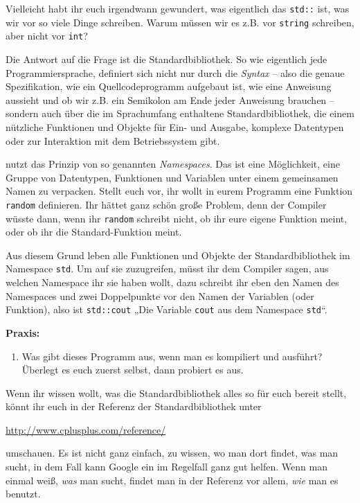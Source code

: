 
Vielleicht habt ihr euch irgendwann gewundert, was eigentlich das
\texttt{std::} ist, was wir vor so viele Dinge schreiben. Warum müssen wir es
z.B. vor \texttt{string} schreiben, aber nicht vor \texttt{int}?

Die Antwort auf die Frage ist die \Cpp Standardbibliothek. So wie eigentlich
jede Programmiersprache, definiert sich \Cpp nicht nur durch die \emph{Syntax}
-- also die genaue Spezifikation, wie ein Quellcodeprogramm aufgebaut ist, wie
eine Anweisung aussieht und ob wir z.B. ein Semikolon am Ende jeder Anweisung
brauchen -- sondern auch über die im Sprachumfang enthaltene
Standardbibliothek, die einem nützliche Funktionen und Objekte für Ein- und
Ausgabe, komplexe Datentypen oder zur Interaktion mit dem Betriebssystem gibt.

\Cpp nutzt das Prinzip von so genannten \emph{Namespaces}. Das ist eine
Möglichkeit, eine Gruppe von Datentypen, Funktionen und Variablen unter einem
gemeinsamen Namen zu verpacken. Stellt euch vor, ihr wollt in eurem Programm
eine Funktion \texttt{random} definieren. Ihr hättet ganz schön große Problem,
denn der Compiler wüsste dann, wenn ihr \texttt{random} schreibt nicht, ob ihr
eure eigene Funktion meint, oder ob ihr die Standard-\Cpp Funktion meint.

Aus diesem Grund leben alle Funktionen und Objekte der \Cpp Standardbibliothek
im Namespace \texttt{std}. Um auf sie zuzugreifen, müsst ihr dem Compiler
sagen, aus welchen Namespace ihr sie haben wollt, dazu schreibt ihr eben den
Namen des Namespaces und zwei Doppelpunkte vor den Namen der Variablen (oder
Funktion), also ist \texttt{std::cout} „Die Variable \texttt{cout} aus dem
Namespace \texttt{std}“.


\textbf{Praxis:}
\begin{enumerate}
    \item Was gibt dieses Programm aus, wenn man es kompiliert und ausführt?
        Überlegt es euch zuerst selbst, dann probiert es aus.
\end{enumerate}

Wenn ihr wissen wollt, was die Standardbibliothek alles so für euch bereit
stellt, könnt ihr euch in der Referenz der Standardbibliothek unter

\url{http://www.cplusplus.com/reference/}

umschauen. Es ist nicht ganz einfach, zu wissen, wo man dort findet, was man
sucht, in dem Fall kann Google ein im Regelfall ganz gut helfen. Wenn man
einmal weiß, \emph{was} man sucht, findet man in der Referenz vor allem,
\emph{wie} man es benutzt.

